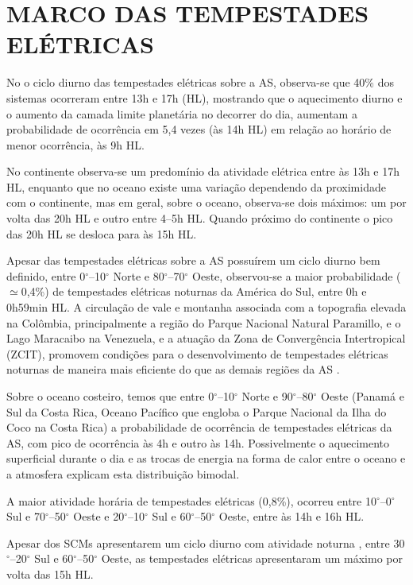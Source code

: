 \section{MARCO DAS TEMPESTADES ELÉTRICAS}

No o ciclo diurno das tempestades elétricas sobre a AS, observa-se que 40\% dos sistemas ocorreram entre 13h e 17h (HL), mostrando que o aquecimento diurno e o aumento da camada limite planetária no decorrer do dia, aumentam a probabilidade de ocorrência em 5,4 vezes (às 14h HL) em relação ao horário de menor ocorrência, às 9h HL.

No continente observa-se um predomínio da atividade elétrica entre às 13h e 17h HL, enquanto que no oceano existe uma variação dependendo da proximidade com o continente, mas em geral, sobre o oceano, observa-se dois máximos: um por volta das 20h HL e outro entre 4--5h HL. Quando próximo do continente o pico das 20h HL se desloca para às 15h HL.  

Apesar das tempestades elétricas sobre a AS possuírem um ciclo diurno bem definido, entre 0$^{\circ}$--10$^{\circ}$ Norte e 80$^{\circ}$--70$^{\circ}$ Oeste, observou-se a maior probabilidade ($\simeq$0,4\%) de tempestades elétricas noturnas da América do Sul, entre 0h e 0h59min HL. A circulação de vale e montanha associada com a topografia elevada na Colômbia, principalmente a região do Parque Nacional Natural Paramillo, e o Lago Maracaibo na Venezuela, e a atuação da Zona de Convergência Intertropical (ZCIT), promovem condições para o desenvolvimento de tempestades elétricas noturnas de maneira mais eficiente do que as demais regiões da AS \cite{burgesser2012}.

Sobre o oceano costeiro, temos que entre 0$^{\circ}$--10$^{\circ}$ Norte e 90$^{\circ}$--80$^{\circ}$ Oeste (Panamá e Sul da Costa Rica,  Oceano Pacífico que engloba o Parque Nacional da Ilha do Coco na Costa Rica) a  probabilidade de ocorrência de tempestades elétricas da AS, com pico de ocorrência às 4h e outro às 14h. Possivelmente o aquecimento superficial durante o dia e as trocas de energia na forma de calor entre o oceano e a atmosfera explicam esta distribuição bimodal.

A maior atividade horária de tempestades elétricas (0,8\%), ocorreu entre 10$^{\circ}$--0$^{\circ}$ Sul e 70$^{\circ}$--50$^{\circ}$ Oeste e 20$^{\circ}$--10$^{\circ}$ Sul e 60$^{\circ}$--50$^{\circ}$ Oeste, entre às 14h e 16h HL.

Apesar dos SCMs apresentarem um ciclo diurno com atividade noturna \cite{Velasco1987, Durkee2009, machado1998}, entre 30$^{\circ}$--20$^{\circ}$ Sul e 60$^{\circ}$--50$^{\circ}$ Oeste, as tempestades elétricas apresentaram um máximo por volta das 15h HL.


